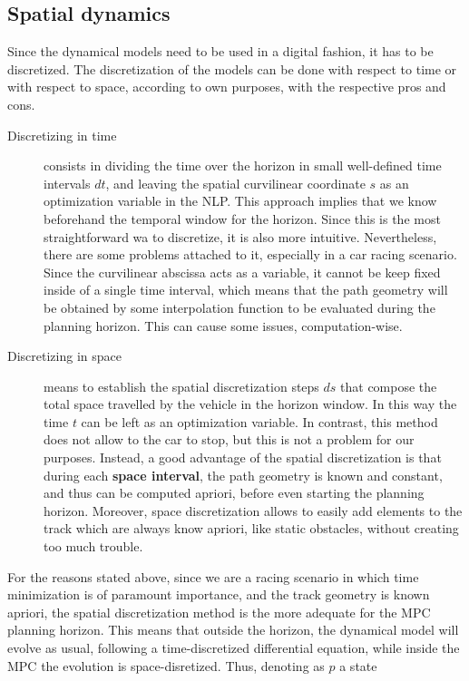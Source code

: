 \documentclass[a4paper, onecolumn, 12pt]{article}
\begin{document}
\subsection{Spatial dynamics} \label{spatial}
Since the dynamical models need to be used in a digital fashion, it has to be
discretized. The discretization of the models can be done with respect to time
or with respect to space, according to own purposes, with the respective pros
and cons.
\begin{description}
    \item[Discretizing in time] consists in dividing the time over the horizon in
    small well-defined time intervals $dt$, and leaving the spatial curvilinear
    coordinate $s$ as an optimization variable in the NLP. This approach implies
    that we know beforehand the temporal window for the horizon. Since this is
    the most straightforward wa to discretize, it is also more intuitive.
    Nevertheless, there are some problems attached to it, especially in a car
    racing scenario. Since the curvilinear abscissa acts as a variable, it
    cannot be keep fixed inside of a single time interval, which means that the
    path geometry will be obtained by some interpolation function to be
    evaluated during the planning horizon. This can cause some issues,
    computation-wise.
    \item[Discretizing in space] means to establish the spatial
    discretization steps $ds$ that compose the total space travelled by the
    vehicle in the horizon window. In this way the time $t$ can be left as an
    optimization variable. In contrast, this method does not allow to the car to
    stop, but this is not a problem for our purposes. Instead, a good advantage
    of the spatial discretization is that during each \textbf{space interval},
    the path geometry is known and constant, and thus can be computed apriori,
    before even starting the planning horizon. Moreover, space discretization
    allows to easily add elements to the track which are always know apriori,
    like static obstacles, without creating too much trouble.
\end{description}
For the reasons stated above, since we are a racing scenario in which time
minimization is of paramount importance, and the track geometry is known
apriori, the spatial discretization method is the more adequate for the MPC
planning horizon. This means that outside the horizon, the dynamical model will
evolve as usual, following a time-discretized differential equation, while
inside the MPC the evolution is space-disretized. Thus, denoting as $p$ a state
\end{document}
